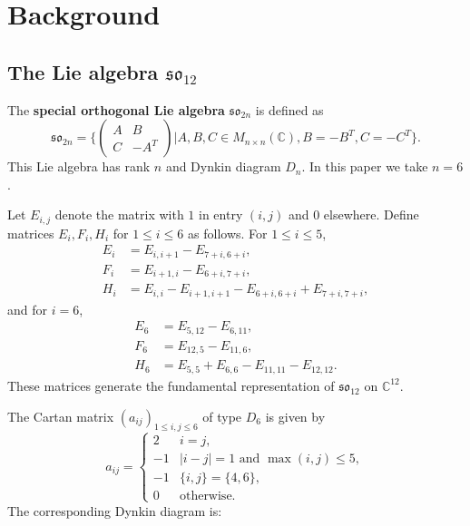 \documentclass{ximera}
\newcommand{\C}{\mathbb{C}}
\newcommand{\so}{\mathfrak{so}}
\begin{document}
\section{Background}\label{sec:background}

\subsection{The Lie algebra $\so_{12}$}

The \textbf{special orthogonal Lie algebra} $\so_{2n}$ is defined as
$$\so_{2n} = \Biggl\{\begin{pmatrix}
A & B \\
C & -A^T
\end{pmatrix}
\Bigg|A,B,C \in M_{n\times n}(\C), B = -B^T, C = -C^T\Biggl\}.$$
This Lie algebra has rank $n$ and Dynkin diagram $D_n$. In this paper we take $n = 6$.

Let $E_{i,j}$ denote the matrix with $1$ in entry $(i, j)$ and $0$ elsewhere. Define matrices $E_i, F_i, H_i$ for $1 \leq i \leq 6$ as follows. For $1 \leq i \leq 5$,
\begin{align*}
    E_i &= E_{i, i+1} - E_{7+i, 6+i}, \\
    F_i &= E_{i+1, i} - E_{6+i, 7+i}, \\
    H_i &= E_{i,i} - E_{i+1, i+1} - E_{6+i,6+i} + E_{7+i,7+i},
\end{align*}
and for $i = 6$,
\begin{align*}
    E_6 &= E_{5, 12} - E_{6, 11}, \\
    F_6 &= E_{12, 5} - E_{11, 6}, \\
    H_6 &= E_{5,5} + E_{6,6} - E_{11,11} - E_{12,12}.
\end{align*}
These matrices generate the fundamental representation of $\so_{12}$ on $\C^{12}$.

The Cartan matrix $(a_{ij})_{1 \leq i,j \leq 6}$ of type $D_6$ is given by
$$a_{ij} = \begin{cases}
    2 & i = j, \\
    -1 & |i - j| = 1 \text{ and } \max(i,j) \leq 5, \\
    -1 & \{i, j\} = \{4, 6\}, \\
    0 & \text{otherwise}.
\end{cases}$$
The corresponding Dynkin diagram is:
\begin{center}
\end{center}
\end{document}
